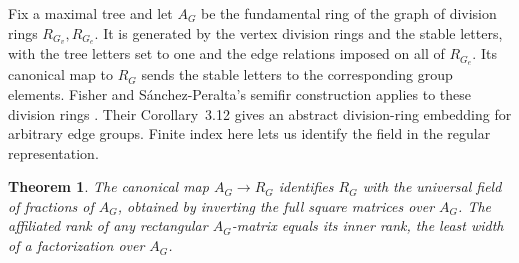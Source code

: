 \documentclass[11pt,a4paper,reqno]{amsart}
\numberwithin{equation}{section}
\newtheorem{theorem}{Theorem}[section]
\theoremstyle{remark}
\begin{document}
Fix a maximal tree and let \(A_G\) be the fundamental ring of the graph of division rings \(R_{G_v},R_{G_e}\). It is generated by the vertex division rings and the stable letters, with the tree letters set to one and the edge relations imposed on all of \(R_{G_e}\). Its canonical map to \(R_G\) sends the stable letters to the corresponding group elements. Fisher and S\'anchez-Peralta's semifir construction applies to these division rings \cite[Definition~3.1 and proof of Theorem~3.10]{FSP}. Their Corollary~3.12 gives an abstract division-ring embedding for arbitrary edge groups. Finite index here lets us identify the field in the regular representation.

\begin{theorem}\label{thm:sac-graph-field}
The canonical map \(A_G\to R_G\) identifies \(R_G\) with the universal field of fractions of \(A_G\), obtained by inverting the full square matrices over \(A_G\). The affiliated rank of any rectangular \(A_G\)-matrix equals its inner rank, the least width of a factorization over \(A_G\).
\end{theorem}
\end{document}
